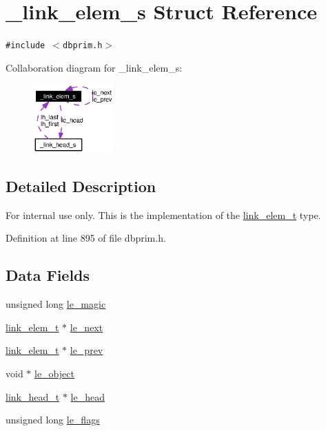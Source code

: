 \hypertarget{struct__link__elem__s}{
\section{\_\-link\_\-elem\_\-s Struct Reference}
\label{struct__link__elem__s}
}
{\tt \#include $<$dbprim.h$>$}

Collaboration diagram for \_\-link\_\-elem\_\-s:\begin{figure}[H]
\begin{center}
\leavevmode
\includegraphics[width=88pt]{struct__link__elem__s__coll__graph}
\end{center}
\end{figure}


\subsection{Detailed Description}
\begin{Desc}
\item[For internal use only.]
This is the implementation of the \hyperlink{group__dbprim__link_ga1}{link\_\-elem\_\-t} type.\end{Desc}




Definition at line 895 of file dbprim.h.\subsection*{Data Fields}
\begin{CompactItemize}
\item 
unsigned long \hyperlink{struct__link__elem__s_o0}{le\_\-magic}
\item 
\hyperlink{struct__link__elem__s}{link\_\-elem\_\-t} $\ast$ \hyperlink{struct__link__elem__s_o1}{le\_\-next}
\item 
\hyperlink{struct__link__elem__s}{link\_\-elem\_\-t} $\ast$ \hyperlink{struct__link__elem__s_o2}{le\_\-prev}
\item 
void $\ast$ \hyperlink{struct__link__elem__s_o3}{le\_\-object}
\item 
\hyperlink{struct__link__head__s}{link\_\-head\_\-t} $\ast$ \hyperlink{struct__link__elem__s_o4}{le\_\-head}
\item 
unsigned long \hyperlink{struct__link__elem__s_o5}{le\_\-flags}
\end{CompactItemize}


